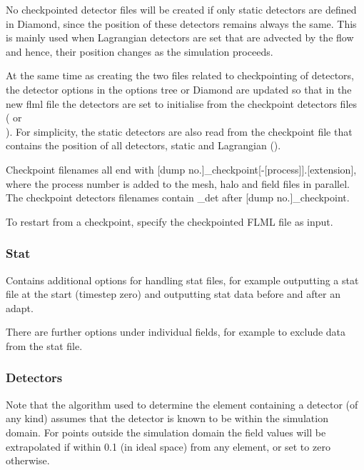 No checkpointed detector files will be created if only static detectors are
defined in Diamond, since the position of these detectors remains always the
same. This is mainly used when Lagrangian detectors are set that are
advected by the flow and hence, their position changes as the simulation
proceeds.

At the same time as creating the two files related to checkpointing of
detectors, the detector options in the options tree or Diamond are updated
so that in the new flml file the detectors are set to initialise from the
checkpoint detectors files \\
( or \\
). For
simplicity, the static detectors are also read from the checkpoint file that
contains the position of all detectors, static and Lagrangian
().

Checkpoint filenames all end with [dump
no.]\_checkpoint[-[process]].[extension], where the process number is added
to the mesh, halo and field files in parallel.  The checkpoint detectors
filenames contain \_det after [dump no.]\_checkpoint.

To restart from a checkpoint, specify the checkpointed FLML file as input.

\subsubsection{Stat}
Contains additional options for handling stat files, for example outputting
a stat file at the start (timestep zero) and outputting stat data before and
after an adapt.

There are further options under individual fields, for example to exclude data from the stat file.

\subsubsection{Detectors}
Note that the algorithm used to determine the element containing a detector (of
any kind) assumes that the detector is known to be within the simulation domain.
For points outside the simulation domain the field values will be extrapolated
if within 0.1 (in ideal space) from any element, or set to zero otherwise.

